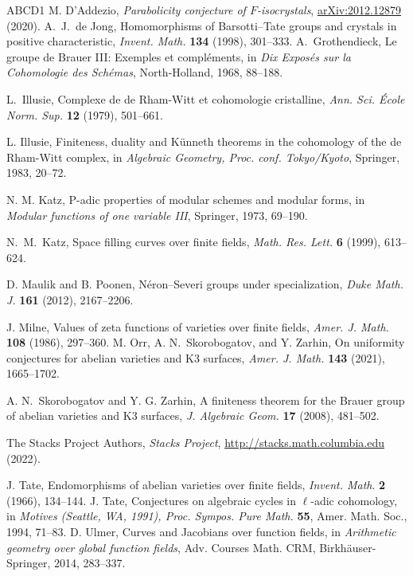 \documentclass[11pt]{amsart}
\begin{document}
\begin{thebibliography}{ABCD1}
	M. D'Addezio, \textit{Parabolicity conjecture of $F$-isocrystals}, \href{https://arxiv.org/abs/2012.12879}{\url{arXiv:2012.12879}} (2020).
	A.~J.~de Jong, Homomorphisms of Barsotti--Tate groups and crystals in positive characteristic, \emph{Invent. Math.} \textbf{134} (1998), 301--333.
	 A.~Grothendieck, Le groupe de Brauer III: Exemples et compléments, in \textit{Dix Exposés sur la Cohomologie des Schémas}, North-Holland, 1968, 88--188.
	

	L.~Illusie, Complexe de de Rham-Witt et cohomologie cristalline, \textit{Ann. Sci. École Norm. Sup.} \textbf{12} (1979), 501--661.

	L. Illusie, Finiteness, duality and K\"unneth theorems in the cohomology of the de Rham-Witt complex, in \textit{Algebraic Geometry, Proc. conf. Tokyo/Kyoto}, Springer, 1983, 20--72.
	
		N. M. Katz, P-adic properties of modular schemes and modular forms, in \textit{Modular functions of one variable III}, Springer, 1973, 69--190.
	
	N.~M.~Katz, Space filling curves over finite fields, \emph{Math. Res. Lett.} \textbf{6} (1999), 613--624.
	
    D. Maulik and B. Poonen, Néron--Severi groups under specialization, \textit{Duke Math. J.} \textbf{161} (2012), 2167--2206.
    
    
	
	 J. Milne, Values of zeta functions of varieties over finite fields, \textit{Amer.
	J. Math.} \textbf{108} (1986), 297--360.
M. Orr, A. N.~Skorobogatov, and Y. Zarhin, On uniformity conjectures for abelian varieties and K3 surfaces,\textit{ Amer. J. Math.} \textbf{143} (2021), 1665--1702. 
	
	 A. N.~Skorobogatov and Y. G. Zarhin, A finiteness theorem for the Brauer group of abelian varieties and K3 surfaces, \emph{J. Algebraic Geom.} \textbf{17} (2008), 481--502.
	
 The Stacks Project Authors, \textit{Stacks Project}, \url{http://stacks.math.columbia.edu} (2022).
	
	 J. Tate, Endomorphisms of abelian varieties over finite fields, \textit{Invent. Math}. \textbf{2} (1966), 134--144.
	 J. Tate, Conjectures on algebraic cycles in $\ell$-adic cohomology, in \textit{Motives (Seattle, WA, 1991), Proc. Sympos. Pure
	Math.} \textbf{55}, Amer. Math. Soc., 1994, 71--83.
	D. Ulmer, Curves and Jacobians over function fields, in \textit{Arithmetic geometry over global function fields}, Adv. Courses Math. CRM, Birkh\"auser-Springer, 2014, 283--337.
\end{thebibliography}
\end{document}
